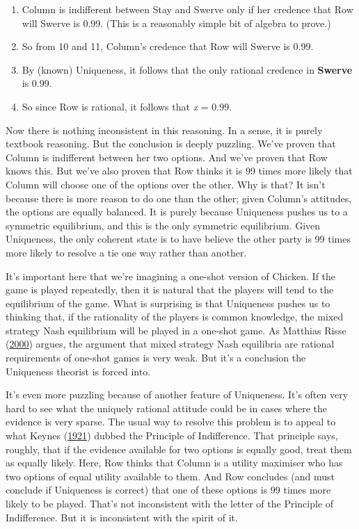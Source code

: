 \documentclass[
  12pt,
  letterpaper,
  DIV=11,
  numbers=noendperiod]{scrreprt}
\begin{document}
\begin{enumerate}
  what Column will do, it must be that Column is indifferent between
  Stay and Swerve given her (i.e., Column's) credences about what Row
  will do.\footnote{If Column was not indifferent between their options,
    the knowledge Row has by step 6 would be sufficient to deduce with
    certainty what Column will do. But at step 9 we showed that Row does
    not know what Column will do.}
\item
  Column is indifferent between Stay and Swerve only if her credence
  that Row will Swerve is 0.99. (This is a reasonably simple bit of
  algebra to prove.)
\item
  So from 10 and 11, Column's credence that Row will Swerve is 0.99.
\item
  By (known) Uniqueness, it follows that the only rational credence in
  \textbf{Swerve} is 0.99.
\item
  So since Row is rational, it follows that \emph{x} = 0.99.
\end{enumerate}

Now there is nothing inconsistent in this reasoning. In a sense, it is
purely textbook reasoning. But the conclusion is deeply puzzling. We've
proven that Column is indifferent between her two options. And we've
proven that Row knows this. But we've also proven that Row thinks it is
99 times more likely that Column will choose one of the options over the
other. Why is that? It isn't because there is more reason to do one than
the other; given Column's attitudes, the options are equally balanced.
It is purely because Uniqueness pushes us to a symmetric equilibrium,
and this is the only symmetric equilibrium. Given Uniqueness, the only
coherent state is to have believe the other party is 99 times more
likely to resolve a tie one way rather than another.

It's important here that we're imagining a one-shot version of Chicken.
If the game is played repeatedly, then it is natural that the players
will tend to the equilibrium of the game. What is surprising is that
Uniqueness pushes us to thinking that, if the rationality of the players
is common knowledge, the mixed strategy Nash equilibrium will be played
in a one-shot game. As Matthias Risse
(\protect\hyperlink{ref-Risse2000}{2000}) argues, the argument that
mixed strategy Nash equilibria are rational requirements of one-shot
games is very weak. But it's a conclusion the Uniqueness theorist is
forced into.

It's even more puzzling because of another feature of Uniqueness. It's
often very hard to see what the uniquely rational attitude could be in
cases where the evidence is very sparse. The usual way to resolve this
problem is to appeal to what Keynes
(\protect\hyperlink{ref-Keynes1921}{1921}) dubbed the Principle of
Indifference. That principle says, roughly, that if the evidence
available for two options is equally good, treat them as equally likely.
Here, Row thinks that Column is a utility maximiser who has two options
of equal utility available to them. And Row concludes (and must conclude
if Uniqueness is correct) that one of these options is 99 times more
likely to be played. That's not inconsistent with the letter of the
Principle of Indifference. But it is inconsistent with the spirit of it.
\end{document}
